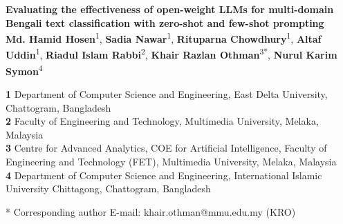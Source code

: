 \documentclass[10pt,letterpaper]{article}
\begin{document}
\vspace*{0.2in}

\begin{flushleft}
{\Large
\textbf{Evaluating the effectiveness of open-weight LLMs for multi-domain Bengali text classification with zero-shot and few-shot prompting}
}
\newline
\\
\textbf{Md. Hamid Hosen}\textsuperscript{1},
\textbf{Sadia Nawar}\textsuperscript{1},
\textbf{Rituparna Chowdhury}\textsuperscript{1},
\textbf{Altaf Uddin}\textsuperscript{1},
\textbf{Riadul Islam Rabbi}\textsuperscript{2},
\textbf{Khair Razlan Othman}\textsuperscript{3*},
\textbf{Nurul Karim Symon}\textsuperscript{4}
\\
\bigskip

\textbf{1} Department of Computer Science and Engineering, East Delta University, Chattogram, Bangladesh
\\
\textbf{2} Faculty of Engineering and Technology, Multimedia University, Melaka, Malaysia
\\
\textbf{3} Centre for Advanced Analytics, COE for Artificial Intelligence, Faculty of Engineering and Technology (FET), Multimedia University, Melaka, Malaysia
\\
\textbf{4} Department of Computer Science and Engineering, International Islamic University Chittagong, Chattogram, Bangladesh
\\
\bigskip

* Corresponding author
E-mail: khair.othman@mmu.edu.my (KRO)

\end{flushleft}
\end{document}
